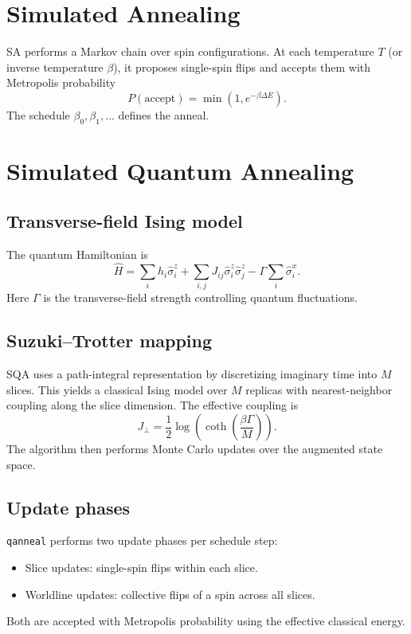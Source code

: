 \documentclass[11pt]{article}
\begin{document}
\section{Simulated Annealing}
SA performs a Markov chain over spin configurations. At each temperature $T$ (or inverse temperature $\beta$), it proposes single-spin flips and accepts them with Metropolis probability
\begin{equation}
P(\text{accept}) = \min\left(1, e^{-\beta \Delta E}\right).
\end{equation}
The schedule $\beta_0,\beta_1,\ldots$ defines the anneal.

\section{Simulated Quantum Annealing}

\subsection{Transverse-field Ising model}
The quantum Hamiltonian is
\begin{equation}
\hat{H} = \sum_i h_i \hat{\sigma}^z_i + \sum_{i,j} J_{ij} \hat{\sigma}^z_i \hat{\sigma}^z_j - \Gamma \sum_i \hat{\sigma}^x_i.
\end{equation}
Here $\Gamma$ is the transverse-field strength controlling quantum fluctuations.

\subsection{Suzuki--Trotter mapping}
SQA uses a path-integral representation by discretizing imaginary time into $M$ slices. This yields a classical Ising model over $M$ replicas with nearest-neighbor coupling along the slice dimension. The effective coupling is
\begin{equation}
J_\perp = \frac{1}{2} \log \left(\coth \left(\frac{\beta \Gamma}{M}\right)\right).
\end{equation}
The algorithm then performs Monte Carlo updates over the augmented state space.

\subsection{Update phases}
\texttt{qanneal} performs two update phases per schedule step:
\begin{itemize}
\item Slice updates: single-spin flips within each slice.
\item Worldline updates: collective flips of a spin across all slices.
\end{itemize}
Both are accepted with Metropolis probability using the effective classical energy.
\end{document}
